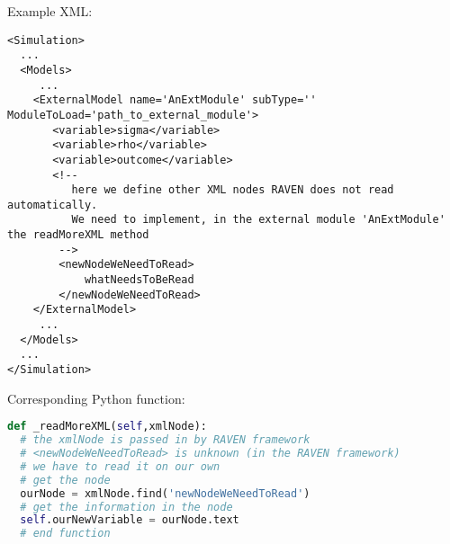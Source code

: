 Example XML:
\begin{lstlisting}[style=XML,morekeywords={subType,ModuleToLoad}]
<Simulation>
  ...
  <Models>
     ...
    <ExternalModel name='AnExtModule' subType='' ModuleToLoad='path_to_external_module'>
       <variable>sigma</variable>
       <variable>rho</variable>
       <variable>outcome</variable>
       <!--
          here we define other XML nodes RAVEN does not read automatically.
          We need to implement, in the external module 'AnExtModule' the readMoreXML method
        -->
        <newNodeWeNeedToRead>
            whatNeedsToBeRead
        </newNodeWeNeedToRead>
    </ExternalModel>
     ...
  </Models>
  ...
</Simulation>
\end{lstlisting}

Corresponding Python function:
\begin{lstlisting}[language=python]
def _readMoreXML(self,xmlNode):
  # the xmlNode is passed in by RAVEN framework
  # <newNodeWeNeedToRead> is unknown (in the RAVEN framework)
  # we have to read it on our own
  # get the node
  ourNode = xmlNode.find('newNodeWeNeedToRead')
  # get the information in the node
  self.ourNewVariable = ourNode.text
  # end function
\end{lstlisting}


